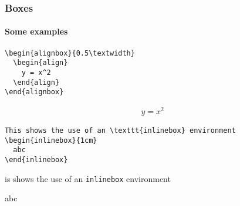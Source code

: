 \documentclass[10pt,t,aspectratio=1610]{beamer}
\begin{document}

\begin{frame}
  \frametitle{Boxes}
  \framesubtitle{Some examples}

\begin{verbatim}
\begin{alignbox}{0.5\textwidth}
  \begin{align}
    y = x^2
  \end{align}
\end{alignbox}
\end{verbatim}

  \begin{alignbox}{0.5\textwidth}
    \begin{align}
      y = x^2
    \end{align}
  \end{alignbox}

\begin{verbatim}
This shows the use of an \texttt{inlinebox} environment
\begin{inlinebox}{1cm}
  abc
\end{inlinebox}
\end{verbatim}\newenvironment{onlinebox}[1]

This shows the use of an \texttt{inlinebox} environment
\begin{inlinebox}{1cm}
  abc
\end{inlinebox}

\end{frame}

\end{document}
